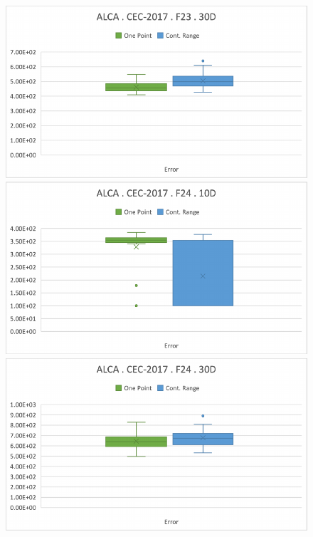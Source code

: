 \documentclass[graybox]{svmult}
\begin{document}
\begin{figure}[!ht]
\begin{minipage}[h]{0.49\linewidth}
        \end{minipage}
        \hfill
        \begin{minipage}[h]{0.49\linewidth}
            \includegraphics[width=1\linewidth]{img/fig_experiment_F23x30D.pdf} 
        \end{minipage}
        \vfill
        \vspace{0.05 cm}
        \begin{minipage}[h]{0.49\linewidth}
            \includegraphics[width=1\linewidth]{img/fig_experiment_F24x10D.pdf} 
        \end{minipage}
        \hfill
        \begin{minipage}[h]{0.49\linewidth}
            \includegraphics[width=1\linewidth]{img/fig_experiment_F24x30D.pdf} 

\end{minipage}
\end{figure}
\end{document}
